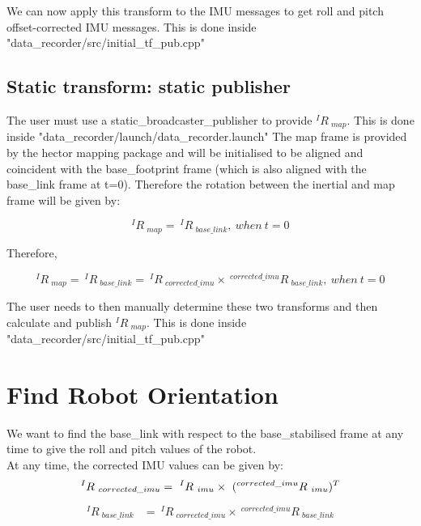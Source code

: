 \documentclass{article}
\begin{document}
We can now apply this transform to the IMU messages to get roll and pitch offset-corrected IMU messages. This is done inside "data\_recorder/src/initial\_tf\_pub.cpp"


\subsection{Static transform: static publisher}
The user must use a static\_broadcaster\_publisher to provide $ {^{I}R\ _{map}}$. This is done inside "data\_recorder/launch/data\_recorder.launch" The map frame is provided by the hector mapping package and will be initialised to be aligned and coincident with the base\_footprint frame (which is also aligned with the base\_link frame at t=0). Therefore the rotation between the inertial and map frame will be given by:

\begin{equation}
^{I}R\ _{map}=\ ^{I}R\ _{base\_link},\ when\ t=0
\end{equation}

Therefore,

\begin{equation}
^{I}R\ _{map}=\ ^{I}R\ _{base\_link}=\ ^{I}R\ _{corrected\_imu} \times\ ^{corrected\_imu}R\ _{base\_link},\ when\ t=0
\end{equation}

The user needs to then manually determine these two transforms and then calculate and publish $^{I}R\ _{map}$. This is done inside "data\_recorder/src/initial\_tf\_pub.cpp"



\section{Find Robot Orientation}
We want to find the base\_link with respect to the base\_stabilised frame at any time to give the roll and pitch values of the robot.
\\

At any time, the corrected IMU values can be given by:
\begin{equation}
^{I}R\ _{corrected\_imu} =\ ^{I}R\ _{imu} \times\  (^{corrected\_imu}R\ _{imu})^T\\
\end{equation}
\begin{align}
^{I}R\ _{base\_link} & =\ ^{I}R\ _{corrected\_imu} \times\  ^{corrected\_imu}R\ _{base\_link}\\
\end{align}
\end{document}
